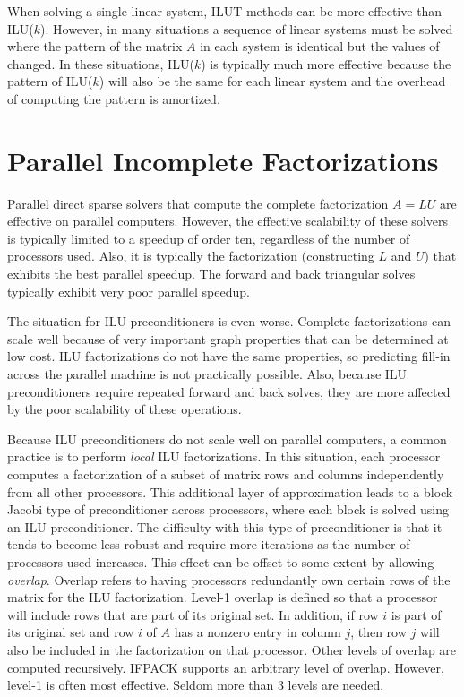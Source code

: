 When solving a single linear system, ILUT methods can be more effective
than ILU($k$).  However, in many situations a sequence of linear systems
must be solved where the pattern of the matrix $A$ in each system is
identical but the values of changed.  In these situations, ILU($k$) is 
typically much more effective because the pattern of ILU($k$) will also
be the same for each linear system and the overhead of computing the
pattern is amortized.

\section{Parallel Incomplete Factorizations}
\label{sec:ifpack_parallel}

Parallel direct sparse solvers that compute the complete factorization $A=LU$
are effective on parallel computers.  However, the effective scalability
of these solvers is typically limited to a speedup of order ten, regardless
of the number of processors used.  Also, it is typically the factorization
(constructing $L$ and $U$) that exhibits the best parallel speedup.  The 
forward and back triangular solves typically exhibit very poor parallel speedup.

The situation for ILU preconditioners is even worse.  Complete factorizations
can scale well because of very important graph properties that can be determined
at low cost.  ILU factorizations do not have the same properties, so predicting
fill-in across the parallel machine is not practically possible.  Also, because ILU
preconditioners require repeated forward and back solves, they are more affected
by the poor scalability of these operations.

Because ILU preconditioners do not scale well on parallel computers, a common
practice is to perform {\em local} ILU factorizations.  In this situation, each
processor computes a factorization of a subset of matrix rows and columns independently
from all other processors.  This additional layer of approximation leads to a block
Jacobi type of preconditioner across processors, where each block is solved using an
ILU preconditioner.  The difficulty with this type of preconditioner is that it 
tends to become less robust and require more iterations as the number of processors used
increases.  This effect can be offset to some extent by allowing {\em overlap}.  Overlap
refers to having processors redundantly own certain rows of the matrix for the ILU
factorization.  Level-1 overlap is defined so that a processor will include rows that
are part of its original set.  In addition, if row $i$ is part of its original set and 
row $i$ of $A$ has a nonzero entry in column $j$, then row $j$ will also
be included in the factorization on that processor.  Other levels of overlap are
computed recursively.  IFPACK supports an arbitrary level of overlap.  However,
level-1 is often most effective.  Seldom more than 3 levels are needed. 

